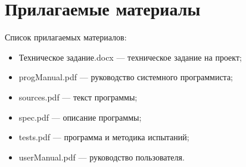 \documentclass[14pt,a4paper]{report}
\begin{document}
	
	\renewcommand{\thesection}{\arabic{section}}
	\setcounter{page}{2}
	\tableofcontents
	\pagebreak
	
	\setcounter{totalnumber}{10}
	\setcounter{topnumber}{10}
	\setcounter{bottomnumber}{10}
	\renewcommand{\topfraction}{1}
	\renewcommand{\textfraction}{0}
	
	
	
	
	
	
	
	\FloatBarrier
			
	\pagebreak
	
	
	\pagebreak	
	\section{Прилагаемые материалы}
	Список прилагаемых материалов:
	\begin{itemize}
		\item Техническое задание.docx --- техническое задание на проект;
		\item progManual.pdf --- руководство системного программиста;
		\item sources.pdf --- текст программы;
		\item spec.pdf --- описание программы;
		\item tests.pdf --- программа и методика испытаний;
		\item userManual.pdf --- руководство пользователя.
	\end{itemize}
	
	
	\pagebreak
	
\end{document}
